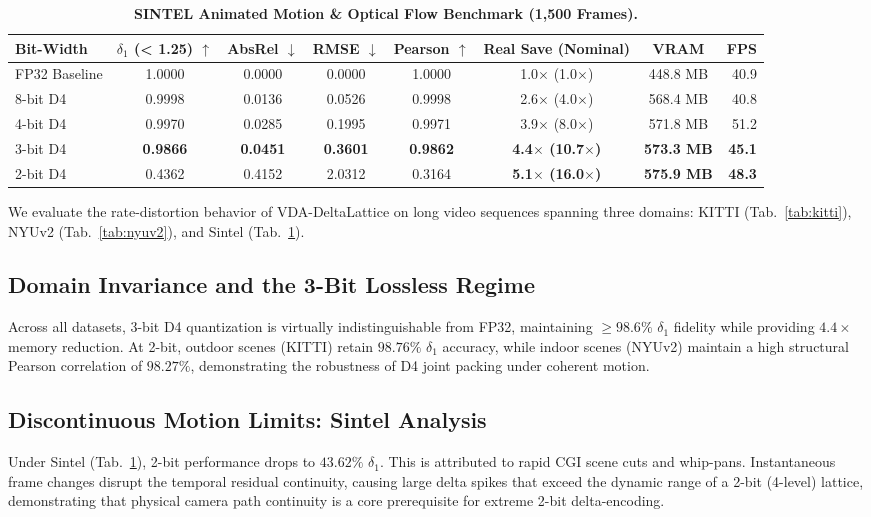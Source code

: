 \documentclass[10pt,twocolumn,letterpaper]{article}
\begin{document}
\begin{table}[t]
\centering
\caption{\textbf{SINTEL Animated Motion \& Optical Flow Benchmark (1,500 Frames).}}
\label{tab:sintel}
\begin{tabular}{lccccccr}
\toprule
Bit-Width & $\delta_1$ (< 1.25) $\uparrow$ & AbsRel $\downarrow$ & RMSE $\downarrow$ & Pearson $\uparrow$ & Real Save (Nominal) & VRAM & FPS \\
\midrule
FP32 Baseline & 1.0000 & 0.0000 & 0.0000 & 1.0000 & 1.0$\times$ (1.0$\times$) & 448.8 MB & 40.9 \\
8-bit D4 & 0.9998 & 0.0136 & 0.0526 & 0.9998 & 2.6$\times$ (4.0$\times$) & 568.4 MB & 40.8 \\
4-bit D4 & 0.9970 & 0.0285 & 0.1995 & 0.9971 & 3.9$\times$ (8.0$\times$) & 571.8 MB & 51.2 \\
3-bit D4 & \textbf{0.9866} & \textbf{0.0451} & \textbf{0.3601} & \textbf{0.9862} & \textbf{4.4$\times$ (10.7$\times$)} & \textbf{573.3 MB} & \textbf{45.1} \\
2-bit D4 & 0.4362 & 0.4152 & 2.0312 & 0.3164 & \textbf{5.1$\times$ (16.0$\times$)} & \textbf{575.9 MB} & \textbf{48.3} \\
\bottomrule
\end{tabular}
\end{table}

We evaluate the rate-distortion behavior of VDA-DeltaLattice on long video sequences spanning three domains: KITTI (Tab.~\ref{tab:kitti}), NYUv2 (Tab.~\ref{tab:nyuv2}), and Sintel (Tab.~\ref{tab:sintel}).

\subsection{Domain Invariance and the 3-Bit Lossless Regime}
Across all datasets, 3-bit D4 quantization is virtually indistinguishable from FP32, maintaining $\ge 98.6\%$ $\delta_1$ fidelity while providing $4.4\times$ memory reduction. At 2-bit, outdoor scenes (KITTI) retain $98.76\%$ $\delta_1$ accuracy, while indoor scenes (NYUv2) maintain a high structural Pearson correlation of $98.27\%$, demonstrating the robustness of D4 joint packing under coherent motion.

\subsection{Discontinuous Motion Limits: Sintel Analysis}
Under Sintel (Tab.~\ref{tab:sintel}), 2-bit performance drops to $43.62\%$ $\delta_1$. This is attributed to rapid CGI scene cuts and whip-pans. Instantaneous frame changes disrupt the temporal residual continuity, causing large delta spikes that exceed the dynamic range of a 2-bit (4-level) lattice, demonstrating that physical camera path continuity is a core prerequisite for extreme 2-bit delta-encoding.
\end{document}
